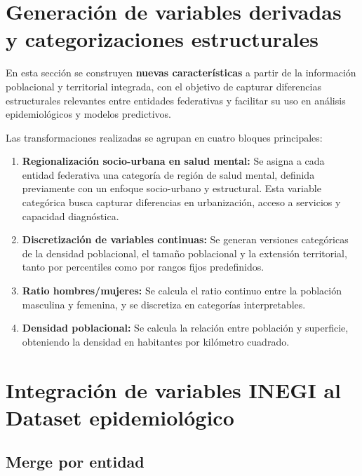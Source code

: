 \documentclass[12pt,letterpaper]{article}
\begin{document}
\section{Generación de variables derivadas y categorizaciones estructurales}

En esta sección se construyen \textbf{nuevas características} a partir de la información poblacional y territorial integrada, con el objetivo de capturar diferencias estructurales relevantes entre entidades federativas y facilitar su uso en análisis epidemiológicos y modelos predictivos.

Las transformaciones realizadas se agrupan en cuatro bloques principales:

\begin{enumerate}
    \item \textbf{Regionalización socio-urbana en salud mental:} Se asigna a cada entidad federativa una categoría de región de salud mental, definida previamente con un enfoque socio-urbano y estructural. Esta variable categórica busca capturar diferencias en urbanización, acceso a servicios y capacidad diagnóstica.
    \item \textbf{Discretización de variables continuas:} Se generan versiones categóricas de la densidad poblacional, el tamaño poblacional y la extensión territorial, tanto por percentiles como por rangos fijos predefinidos.
    \item \textbf{Ratio hombres/mujeres:} Se calcula el ratio continuo entre la población masculina y femenina, y se discretiza en categorías interpretables.
    \item \textbf{Densidad poblacional:} Se calcula la relación entre población y superficie, obteniendo la densidad en habitantes por kilómetro cuadrado.
\end{enumerate}

\section{Integración de variables INEGI al Dataset epidemiológico}

\subsection{Merge por entidad}
\end{document}
